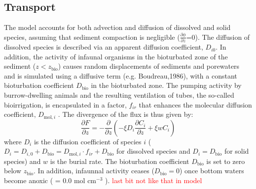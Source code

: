 \documentclass[gmd, manuscript]{copernicus}
\begin{document}
\subsection{Transport}\label{subsec:Transport}
The model accounts for both advection and diffusion of dissolved and solid species, assuming that sediment compaction is negligible ($\frac{\partial \phi}{\partial z}$=0). 
The diffusion of dissolved species is described via an apparent diffusion coefficient, $D_{i0}$. In addition, the activity of infaunal organisms in the bioturbated zone of the sediment ($z<z_{\mathrm{bio}}$) causes random 
displacements of sediments and porewaters and is simulated using a diffusive term (e.g. Boudreau,1986), with a constant bioturbation coefficient $D_{\mathrm{bio}}$ in the bioturbated zone. 
The pumping activity by burrow-dwelling animals and the resulting ventilation of tubes, the so-called bioirrigation, is encapsulated in a factor, $f_{ir}$ that enhances the molecular diffusion coefficient, 
$D_{\mathrm{mol},i}$ \citep[ hence, $D_{i,0}=D_{\mathrm{mol},i}\cdot f_{ir}$,][]{soetaert1996dynamic}.  The divergence of the flux is thus given by:
\begin{equation}
\frac{\partial F}{\partial z}=-\frac{\partial}{\partial z}\left( -\xi D_i \frac{\partial C_i}{\partial z} +\xi w C_i\right) \label{Eq_flux_divergence}
\end{equation}
where $D_i$ is the diffusion coefficient of species $i$ ($D_i=D_{i,0}+D_{\mathrm{bio}}=D_{\mathrm{mol},i}\cdot f_{ir}+D_{\mathrm{bio}}$ for dissolved species and $D_i=D_{\mathrm{bio}}$ for solid species) and $w$ is the burial rate. 
The bioturbation coefficient $D_{\mathrm{bio}}$ is set to zero below $z_{\mathrm{bio}}$. In addition, infaunnal activity ceases ($D_{\mathrm{bio}}=0$) once bottom waters become anoxic ( = 0.0 mol cm$^{-3}$ ). 
\textcolor{red}{last bit not like that in model}
\end{document}
